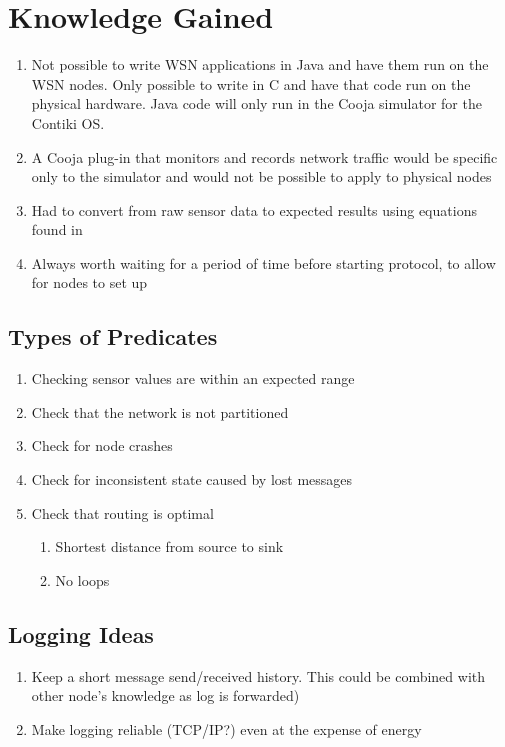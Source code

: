 \documentclass[a4paper,notitlepage]{article}
\begin{document}
\clearpage



\clearpage



\clearpage


\section{Knowledge Gained}
\begin{enumerate}
	\item Not possible to write WSN applications in Java and have them run on the WSN nodes. Only possible to write in C and have that code run on the physical hardware. Java code will only run in the Cooja simulator for the Contiki OS.
	\item A Cooja plug-in that monitors and records network traffic would be specific only to the simulator and would not be possible to apply to physical nodes
	\item Had to convert from raw sensor data to expected results using equations found in \cite{sensiriondatasheet}
	\item Always worth waiting for a period of time before starting protocol, to allow for nodes to set up
\end{enumerate}

\subsection{Types of Predicates}
\begin{enumerate}
	\item Checking sensor values are within an expected range
	\item Check that the network is not partitioned
	\item Check for node crashes
	\item Check for inconsistent state caused by lost messages
	\item Check that routing is optimal
	\begin{enumerate}
		\item Shortest distance from source to sink
		\item No loops
	\end{enumerate}
\end{enumerate}

\subsection{Logging Ideas}
\begin{enumerate}
	\item Keep a short message send/received history. This could be combined with other node's knowledge as log is forwarded)
	\item Make logging reliable (TCP/IP?) even at the expense of energy
\end{enumerate}
\end{document}
